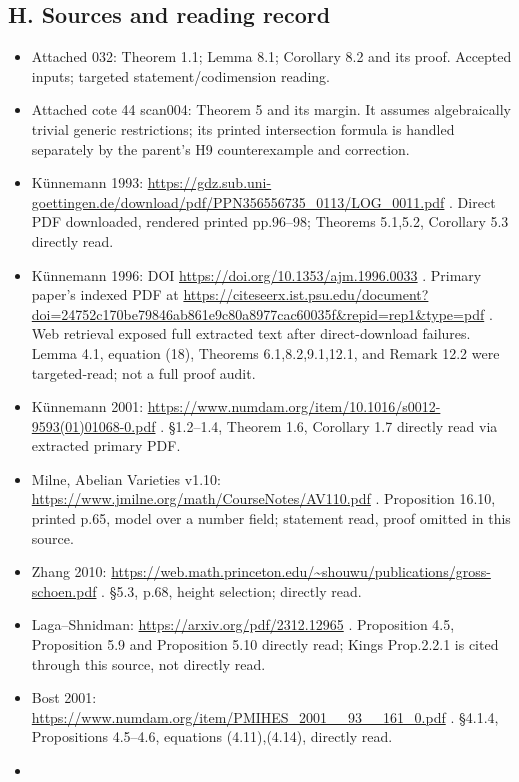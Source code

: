 \documentclass[11pt,a4paper]{article}
\providecommand{\tightlist}{\setlength{\itemsep}{0pt}\setlength{\parskip}{0pt}}
\begin{document}
\subsection{H. Sources and reading
record}\label{h.-sources-and-reading-record}

\begin{itemize}
\tightlist
\item
  Attached 032: Theorem 1.1; Lemma 8.1; Corollary 8.2 and its proof.
  Accepted inputs; targeted statement/codimension reading.
\item
  Attached cote 44 scan004: Theorem 5 and its margin. It assumes
  algebraically trivial generic restrictions; its printed intersection
  formula is handled separately by the parent's H9 counterexample and
  correction.
\item
  Künnemann 1993:
  \url{https://gdz.sub.uni-goettingen.de/download/pdf/PPN356556735_0113/LOG_0011.pdf}
  . Direct PDF downloaded, rendered printed pp.96--98; Theorems 5.1,5.2,
  Corollary 5.3 directly read.
\item
  Künnemann 1996: DOI \url{https://doi.org/10.1353/ajm.1996.0033} . Primary
  paper's indexed PDF at
  \url{https://citeseerx.ist.psu.edu/document?doi=24752c170be79846ab861e9c80a8977cac60035f&repid=rep1&type=pdf}
  . Web retrieval exposed full extracted text after direct-download
  failures. Lemma 4.1, equation (18), Theorems 6.1,8.2,9.1,12.1, and
  Remark 12.2 were targeted-read; not a full proof audit.
\item
  Künnemann 2001:
  \url{https://www.numdam.org/item/10.1016/s0012-9593(01)01068-0.pdf} .
  §1.2--1.4, Theorem 1.6, Corollary 1.7 directly read via extracted
  primary PDF.
\item
  Milne, Abelian Varieties v1.10:
  \url{https://www.jmilne.org/math/CourseNotes/AV110.pdf} . Proposition 16.10,
  printed p.65, model over a number field; statement read, proof omitted
  in this source.
\item
  Zhang 2010:
  \url{https://web.math.princeton.edu/~shouwu/publications/gross-schoen.pdf}
  . §5.3, p.68, height selection; directly read.
\item
  Laga--Shnidman: \url{https://arxiv.org/pdf/2312.12965} . Proposition 4.5,
  Proposition 5.9 and Proposition 5.10 directly read; Kings Prop.2.2.1
  is cited through this source, not directly read.
\item
  Bost 2001:
  \url{https://www.numdam.org/item/PMIHES_2001__93__161_0.pdf} . §4.1.4,
  Propositions 4.5--4.6, equations (4.11),(4.14), directly read.
\item

\end{itemize}
\end{document}
